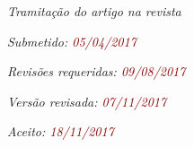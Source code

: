 \documentclass[
	article,			%
	12pt,				%
    twoside,			%
	a4paper,			%
	english,			%
	french,				%
	spanish,			%
	brazil,				%
	]{abntex2}
\begin{document}
\postextual


{\small
 
}


{\footnotesize
\hfill
\begin{minipage}[b]{.4\textwidth}
\textit{Tramitação do artigo na revista}

\textit{Submetido: \textcolor{darkred}{05/04/2017}}

\textit{Revisões requeridas: \textcolor{darkred}{09/08/2017}}

\textit{Versão revisada: \textcolor{darkred}{07/11/2017}}

\textit{Aceito: \textcolor{darkred}{18/11/2017}}
\end{minipage}
}
\end{document}
